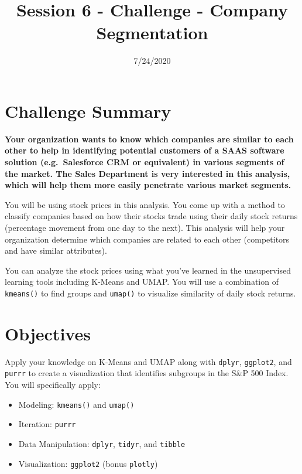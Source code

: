 \documentclass[
]{article}
\title{Session 6 - Challenge - Company Segmentation}
\author{}
\date{\vspace{-2.5em}7/24/2020}
\providecommand{\tightlist}{%
  \setlength{\itemsep}{0pt}\setlength{\parskip}{0pt}}
\begin{document}
\maketitle

{
\setcounter{tocdepth}{2}
\tableofcontents
}
\hypertarget{challenge-summary}{%
\section{Challenge Summary}\label{challenge-summary}}

\textbf{Your organization wants to know which companies are similar to
each other to help in identifying potential customers of a SAAS software
solution (e.g.~Salesforce CRM or equivalent) in various segments of the
market. The Sales Department is very interested in this analysis, which
will help them more easily penetrate various market segments.}

You will be using stock prices in this analysis. You come up with a
method to classify companies based on how their stocks trade using their
daily stock returns (percentage movement from one day to the next). This
analysis will help your organization determine which companies are
related to each other (competitors and have similar attributes).

You can analyze the stock prices using what you've learned in the
unsupervised learning tools including K-Means and UMAP. You will use a
combination of \texttt{kmeans()} to find groups and \texttt{umap()} to
visualize similarity of daily stock returns.

\hypertarget{objectives}{%
\section{Objectives}\label{objectives}}

Apply your knowledge on K-Means and UMAP along with \texttt{dplyr},
\texttt{ggplot2}, and \texttt{purrr} to create a visualization that
identifies subgroups in the S\&P 500 Index. You will specifically apply:

\begin{itemize}
\tightlist
\item
  Modeling: \texttt{kmeans()} and \texttt{umap()}
\item
  Iteration: \texttt{purrr}
\item
  Data Manipulation: \texttt{dplyr}, \texttt{tidyr}, and \texttt{tibble}
\item
  Visualization: \texttt{ggplot2} (bonus \texttt{plotly})
\end{itemize}
\end{document}
